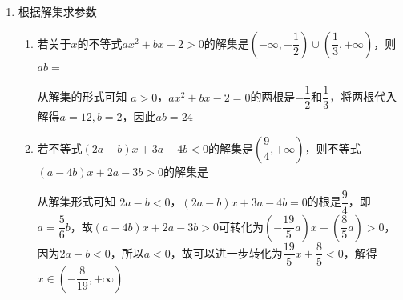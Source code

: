 \begin{enumerate}
\begin{enumerate}
        \begin{jieda}
            若$k = 0$，则方程退化为一次方程，不会有两根。\\
            若$k \neq 0$，则应有$\Delta = (8k+1)^2 - 64k^2 = 16k + 1 > 0$，因此$k \in \left(-\dfrac{1}{16}, 0\right) \cup (0, +\infty)$
        \end{jieda}
    \end{enumerate}
    \item 根据解集求参数
    \begin{enumerate}
        \item 若关于$x$的不等式$ax^2+bx-2>0$的解集是$\left(-\infty, -\dfrac{1}{2}\right) \cup \left(\dfrac{1}{3}, +\infty\right)$，则$ab = $
        \begin{jieda}
            从解集的形式可知 $a > 0$，$ax^2+bx-2=0$的两根是$-\dfrac{1}{2}$和$\dfrac{1}{3}$，将两根代入解得$a = 12, b = 2$，因此$ab = 24$
        \end{jieda}
        \item 若不等式$(2a-b)x +3a - 4b < 0$的解集是$\left(\dfrac{9}{4}, +\infty\right)$，则不等式$(a-4b)x + 2a - 3b > 0$的解集是
        \begin{jieda}
            从解集形式可知 $2a-b < 0$，$(2a-b)x +3a - 4b = 0$的根是$\dfrac{9}{4}$，即$a = \dfrac{5}{6}b$，故$(a-4b)x + 2a - 3b > 0$可转化为$\left(-\dfrac{19}{5}a\right)x - \left(\dfrac{8}{5}a\right) > 0$，因为$2a-b < 0$，所以$a < 0$，故可以进一步转化为$\dfrac{19}{5}x + \dfrac{8}{5} < 0$，解得$x \in \left(-\dfrac{8}{19}, +\infty\right)$
        \end{jieda}
       

\end{enumerate}
\end{enumerate}

